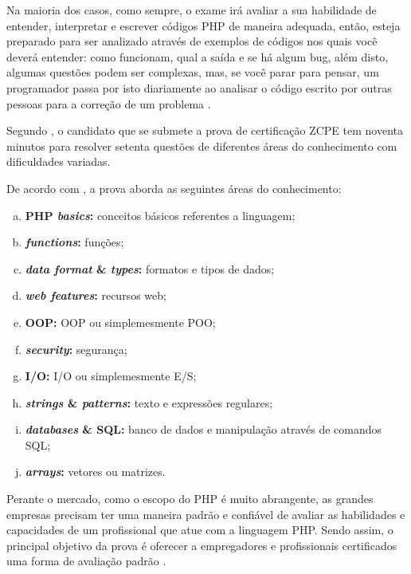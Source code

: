 Na maioria dos casos, como sempre, o exame irá avaliar a sua habilidade de
entender, interpretar e escrever códigos \acs{PHP} de maneira adequada, então,
esteja preparado para ser analizado através de exemplos de códigos nos quais
você deverá entender: como funcionam, qual a saída e se há algum \acs{bug},
além disto, algumas questões podem ser complexas, mas, se você parar para
pensar, um programador passa por isto diariamente ao analisar o código escrito
por outras pessoas para a correção de um problema
\cite{theZendPHPCertificationPracticeTestBook}.

Segundo , o candidato que se
submete a prova de certificação \acs{ZCPE} tem noventa minutos para resolver 
setenta questões de diferentes áreas do conhecimento com dificuldades variadas.

De acordo com , a prova aborda as seguintes áreas do
conhecimento:

\begin{enumerate}[a)]
    \item \textbf{\acs{PHP} \textit{basics}:} 				conceitos básicos referentes a
    linguagem;
    \item \textbf{\textit{functions}:} 						funções;
    \item \textbf{\textit{data format} \& \textit{types}:} 	formatos e tipos de
    dados;
    \item \textbf{\textit{web features}:} 					recursos web;
    \item \textbf{\acs{OOP}:}								\acl{OOP} ou simplemesmente \ac{POO};
    \item \textbf{\textit{security}:} 						segurança;
    \item \textbf{\acs{I/O}:} 								\acl{I/O} ou simplemesmente \ac{E/S};
    \item \textbf{\textit{strings} \& \textit{patterns}:} 	texto e expressões
    regulares;
    \item \textbf{\textit{databases} \& \acs{SQL}:} 		banco de dados e
    manipulação através de comandos \ac{SQL};
    \item \textbf{\textit{arrays}:} 						vetores ou matrizes.
\end{enumerate}

Perante o mercado, como o escopo do PHP é muito abrangente, as grandes empresas
precisam ter uma maneira padrão e confiável de avaliar as habilidades e 
capacidades de um profissional que atue com a linguagem PHP. Sendo assim, o
principal objetivo da prova é oferecer a empregadores e profissionais 
certificados uma forma de avaliação padrão \cite{zendPhp5CertificationStudyGuide}.

